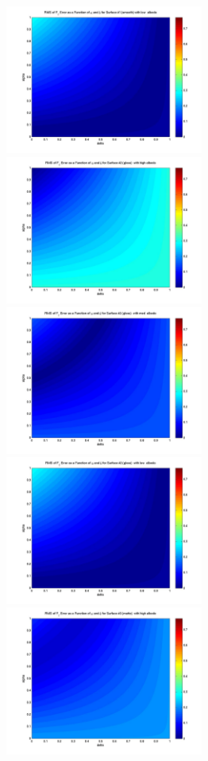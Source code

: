 \begin{description}
\begin{figure}[!ht]
\begin{minipage}[t]{200mm}
    \includegraphics[width=65mm]{figs/sda/F_z_error_albedo__low_surf_smooth.jpg}
    \includegraphics[width=65mm]{figs/sda/F_z_error_albedo_high_surf__gloss.jpg}
    \includegraphics[width=65mm]{figs/sda/F_z_error_albedo__med_surf__gloss.jpg}
    \includegraphics[width=65mm]{figs/sda/F_z_error_albedo__low_surf__gloss.jpg}
    \includegraphics[width=65mm]{figs/sda/F_z_error_albedo_high_surf__matte.jpg}

\end{minipage}
\end{figure}
\end{description}
